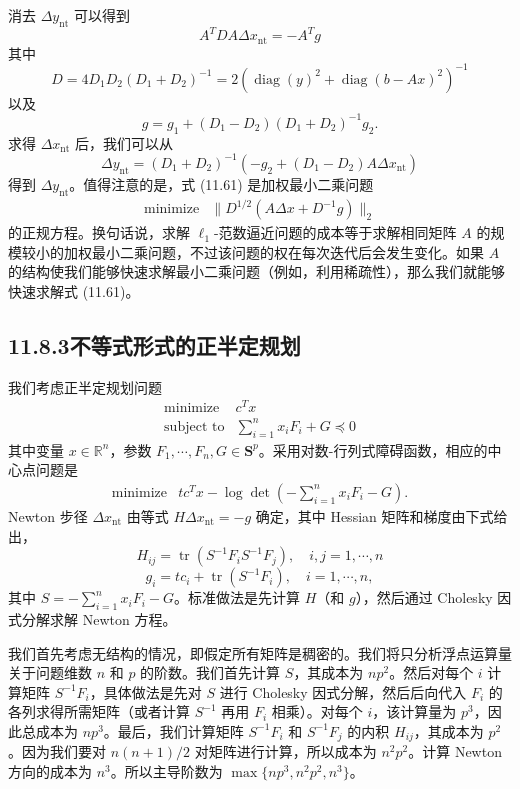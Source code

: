 \documentclass[UTF8,12pt,a4paper,fontset=fandol]{ctexart}
\begin{document}
消去 $\Delta y_{\mathrm{nt}}$ 可以得到
\begin{equation}
A^TDA\Delta x_{\mathrm{nt}}=-A^Tg
\tag{11.61}
\end{equation}
其中
\[
D=4D_1D_2(D_1+D_2)^{-1}
=2\left(\operatorname{diag}(y)^2+\operatorname{diag}(b-Ax)^2\right)^{-1}
\]
以及
\[
g=g_1+(D_1-D_2)(D_1+D_2)^{-1}g_2.
\]
求得 $\Delta x_{\mathrm{nt}}$ 后，我们可以从
\[
\Delta y_{\mathrm{nt}}=(D_1+D_2)^{-1}(-g_2+(D_1-D_2)A\Delta x_{\mathrm{nt}})
\]
得到 $\Delta y_{\mathrm{nt}}$。值得注意的是，式 (11.61) 是加权最小二乘问题
\[
\begin{array}{ll}
\text{minimize} & \|D^{1/2}(A\Delta x+D^{-1}g)\|_2
\end{array}
\]
的正规方程。换句话说，求解 $\ell_1$-范数逼近问题的成本等于求解相同矩阵 $A$ 的规模较小的加权最小二乘问题，不过该问题的权在每次迭代后会发生变化。如果 $A$ 的结构使我们能够快速求解最小二乘问题（例如，利用稀疏性），那么我们就能够快速求解式 (11.61)。

\subsection*{11.8.3\quad 不等式形式的正半定规划}

我们考虑正半定规划问题
\[
\begin{array}{ll}
\text{minimize} & c^Tx\\
\text{subject to} & \displaystyle\sum_{i=1}^n x_iF_i+G\preceq 0
\end{array}
\]
其中变量 $x\in\mathbb{R}^n$，参数 $F_1,\cdots,F_n,G\in\mathbf{S}^p$。采用对数-行列式障碍函数，相应的中心点问题是
\[
\begin{array}{ll}
\text{minimize} & tc^Tx-\log\det\left(-\displaystyle\sum_{i=1}^n x_iF_i-G\right).
\end{array}
\]
Newton 步径 $\Delta x_{\mathrm{nt}}$ 由等式 $H\Delta x_{\mathrm{nt}}=-g$ 确定，其中 Hessian 矩阵和梯度由下式给出，
\[
H_{ij}=\operatorname{tr}(S^{-1}F_iS^{-1}F_j),\quad i,j=1,\cdots,n
\]
\[
g_i=tc_i+\operatorname{tr}(S^{-1}F_i),\quad i=1,\cdots,n,
\]
其中 $S=-\sum_{i=1}^n x_iF_i-G$。标准做法是先计算 $H$（和 $g$），然后通过 Cholesky 因式分解求解 Newton 方程。

我们首先考虑无结构的情况，即假定所有矩阵是稠密的。我们将只分析浮点运算量关于问题维数 $n$ 和 $p$ 的阶数。我们首先计算 $S$，其成本为 $np^2$。然后对每个 $i$ 计算矩阵 $S^{-1}F_i$，具体做法是先对 $S$ 进行 Cholesky 因式分解，然后后向代入 $F_i$ 的各列求得所需矩阵（或者计算 $S^{-1}$ 再用 $F_i$ 相乘）。对每个 $i$，该计算量为 $p^3$，因此总成本为 $np^3$。最后，我们计算矩阵 $S^{-1}F_i$ 和 $S^{-1}F_j$ 的内积 $H_{ij}$，其成本为 $p^2$。因为我们要对 $n(n+1)/2$ 对矩阵进行计算，所以成本为 $n^2p^2$。计算 Newton 方向的成本为 $n^3$。所以主导阶数为 $\max\{np^3,n^2p^2,n^3\}$。
\end{document}
